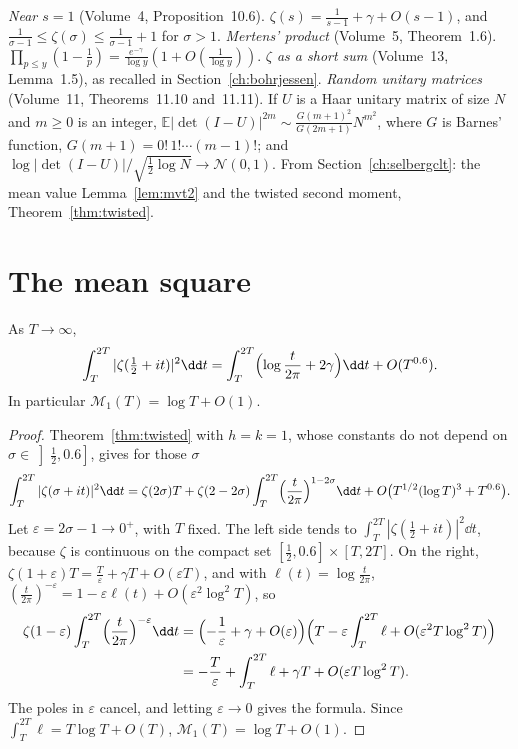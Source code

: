 \begin{reminder}
\emph{Near $s=1$} (Volume~4, Proposition~10.6). $\zeta(s)=\frac1{s-1}+\gamma+O(s-1)$, and $\frac1{\sigma-1}\le\zeta(\sigma)\le\frac1{\sigma-1}+1$ for $\sigma>1$.
\emph{Mertens' product} (Volume~5, Theorem~1.6). $\prod_{p\le y}(1-\frac1p)=\frac{e^{-\gamma}}{\log y}(1+O(\frac1{\log y}))$.
\emph{$\zeta$ as a short sum} (Volume~13, Lemma~1.5), as recalled in Section~\ref{ch:bohrjessen}.
\emph{Random unitary matrices} (Volume~11, Theorems~11.10 and~11.11). If $U$ is a Haar unitary matrix of size $N$ and $m\ge0$ is an integer, $\mathbb E|\det(I-U)|^{2m}\sim\frac{G(m+1)^2}{G(2m+1)}N^{m^2}$, where $G$ is Barnes' function, $G(m+1)=0!\,1!\cdots(m-1)!$; and $\log|\det(I-U)|/\sqrt{\frac12\log N}\to\mathcal N(0,1)$.
From Section~\ref{ch:selbergclt}: the mean value Lemma~\ref{lem:mvt2} and the twisted second moment, Theorem~\ref{thm:twisted}.
\end{reminder}

\section{The mean square}

\begin{theorem}\label{thm:ingham}
As $T\to\infty$,
\[
\int_T^{2T}|\zeta(\tfrac12+it)|^2\dd t=\int_T^{2T}\Bigl(\log\frac t{2\pi}+2\gamma\Bigr)\dd t+O(T^{0.6}).
\]
In particular $\mathcal M_1(T)=\log T+O(1)$.
\end{theorem}
\begin{proof}
Theorem~\ref{thm:twisted} with $h=k=1$, whose constants do not depend on $\sigma\in\left]\frac12,0.6\right]$, gives for those $\sigma$
\[
\int_T^{2T}|\zeta(\sigma+it)|^2\dd t=\zeta(2\sigma)T+\zeta(2-2\sigma)\int_T^{2T}\Bigl(\frac t{2\pi}\Bigr)^{1-2\sigma}\dd t+O\bigl(T^{1/2}(\log T)^3+T^{0.6}\bigr).
\]
Let $\varepsilon=2\sigma-1\to0^+$, with $T$ fixed. The left side tends to $\int_T^{2T}|\zeta(\frac12+it)|^2\dd t$, because $\zeta$ is continuous on the compact set $[\frac12,0.6]\times[T,2T]$. On the right, $\zeta(1+\varepsilon)T=\frac T\varepsilon+\gamma T+O(\varepsilon T)$, and with $\ell(t)=\log\frac t{2\pi}$, $(\frac t{2\pi})^{-\varepsilon}=1-\varepsilon\ell(t)+O(\varepsilon^2\log^2T)$, so
\[
\begin{aligned}
\zeta(1-\varepsilon)\int_T^{2T}\Bigl(\frac t{2\pi}\Bigr)^{-\varepsilon}\dd t
&=\Bigl(-\frac1\varepsilon+\gamma+O(\varepsilon)\Bigr)\Bigl(T-\varepsilon\int_T^{2T}\ell+O(\varepsilon^2T\log^2T)\Bigr)\\
&=-\frac T\varepsilon+\int_T^{2T}\ell+\gamma T+O(\varepsilon T\log^2T).
\end{aligned}
\]
The poles in $\varepsilon$ cancel, and letting $\varepsilon\to0$ gives the formula. Since $\int_T^{2T}\ell=T\log T+O(T)$, $\mathcal M_1(T)=\log T+O(1)$.
\end{proof}

